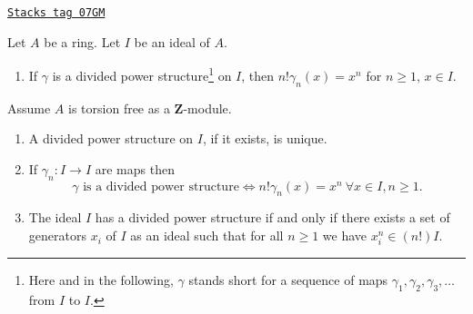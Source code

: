 \begin{lemma}[Silly]
\label{dpa-lemma-silly}
\href{https://stacks.math.columbia.edu/tag/07GM}{\texttt{Stacks tag 07GM}}

Let $A$ be a ring. Let $I$ be an ideal of $A$.
\begin{enumerate}
\item If $\gamma$ is a divided power structure\footnote{Here
and in the following, $\gamma$ stands short for a sequence
of maps $\gamma_1, \gamma_2, \gamma_3, \ldots$ from $I$ to $I$.}
on $I$, then
$n! \gamma_n(x) = x^n$ for $n \geq 1$, $x \in I$.
\end{enumerate}
Assume $A$ is torsion free as a $\mathbf{Z}$-module.
\begin{enumerate}
\item[(2)] A divided power structure on $I$, if it exists, is unique.
\item[(3)] If $\gamma_n : I \to I$ are maps then
$$
\gamma\text{ is a divided power structure}
\Leftrightarrow
n! \gamma_n(x) = x^n\ \forall x \in I, n \geq 1.
$$
\item[(4)] The ideal $I$ has a divided power structure
if and only if there exists
a set of generators $x_i$ of $I$ as an ideal such that
for all $n \geq 1$ we have $x_i^n \in (n!)I$.
\end{enumerate}
\end{lemma}

